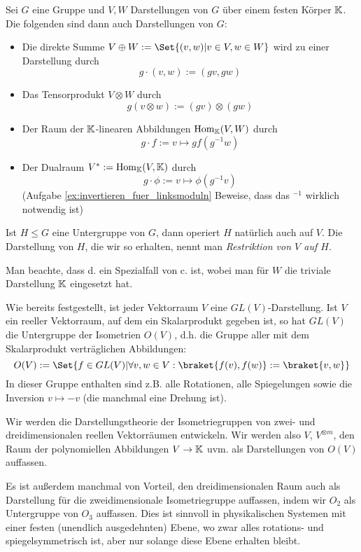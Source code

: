 \begin{lemmadef}
Sei $G$ eine Gruppe und $V,W$ Darstellungen von $G$ über einem festen Körper $\mathbb{K}$. Die folgenden sind dann auch Darstellungen von $G$:
\begin{itemize}
\item Die direkte Summe $V\oplus W := \Set{(v,w) | v\in V, w\in W}$ wird zu einer Darstellung durch
\[g\cdot(v,w) := (gv,gw)\]
\item Das Tensorprodukt $V\otimes W$ durch
\[g(v\otimes w) := (gv)\otimes (gw)\]
\item Der Raum der $\mathbb{K}$-linearen Abbildungen $\operatorname{Hom}_{\mathbb{K}}(V,W)$ durch
\[g\cdot f := v\mapsto gf(g^{-1} w)\]
\item Der Dualraum $V^\ast:= \operatorname{Hom}_{\mathbb{K}}(V,\mathbb{K})$ durch
\[g\cdot \phi := v\mapsto \phi(g^{-1} v)\]
(Aufgabe \ref{ex:invertieren_fuer_linksmoduln} Beweise, dass das $^{-1}$ wirklich notwendig ist)
\end{itemize}
Ist $H\leq G$ eine Untergruppe von $G$, dann operiert $H$ natürlich auch auf $V$. Die Darstellung von $H$, die wir so erhalten, nennt man \emph{Restriktion von $V$ auf $H$}.
\end{lemmadef}

\begin{remark}
Man beachte, dass d. ein Spezialfall von c. ist, wobei man für $W$ die triviale Darstellung $\mathbb{K}$ eingesetzt hat.
\end{remark}

\begin{example}
Wie bereits festgestellt, ist jeder Vektorraum $V$ eine $GL(V)$-Darstellung. Ist $V$ ein reeller Vektorraum, auf dem ein Skalarprodukt gegeben ist, so hat $GL(V)$ die Untergruppe der Isometrien $O(V)$, d.h. die Gruppe aller mit dem Skalarprodukt verträglichen Abbildungen:
\[O(V) := \Set{f\in GL(V) | \forall v,w\in V: \braket{f(v),f(w)} := \braket{v,w}}\]
In dieser Gruppe enthalten sind z.B. alle Rotationen, alle Spiegelungen sowie die Inversion $v\mapsto -v$ (die manchmal eine Drehung ist).

\smallbreak
Wir werden die Darstellungstheorie der Isometriegruppen von zwei- und dreidimensionalen reellen Vektorräumen entwickeln. Wir werden also $V$, $V^{\otimes m}$, den Raum der polynomiellen Abbildungen $V\to\mathbb{K}$ uvm. als Darstellungen von $O(V)$ auffassen.

\smallbreak
Es ist außerdem manchmal von Vorteil, den dreidimensionalen Raum auch als Darstellung für die zweidimensionale Isometriegruppe auffassen, indem wir $O_2$ als Untergruppe von $O_3$ auffassen. Dies ist sinnvoll in physikalischen Systemen mit einer festen (unendlich ausgedehnten) Ebene, wo zwar alles rotations- und spiegelsymmetrisch ist, aber nur solange diese Ebene erhalten bleibt.
\end{example}

